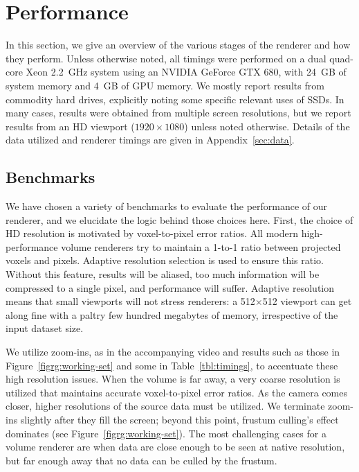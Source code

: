 \section{Performance}
\label{sec:performance}

In this section, we give an overview of the various stages of the
renderer and how they perform.  Unless otherwise noted, all timings
were performed on a dual quad-core Xeon 2.2~GHz system using an NVIDIA
GeForce GTX 680, with 24~GB of system memory and 4~GB of GPU memory.
We mostly report results from commodity hard drives, explicitly noting
some specific relevant uses of SSDs.  In many cases, results were
obtained from multiple screen resolutions, but we report results from
an HD viewport ($1920\times1080$) unless noted otherwise.  Details of
the data utilized and renderer timings are given in
Appendix~\ref{sec:data}.

\subsection{Benchmarks}

We have chosen a variety of benchmarks to evaluate the performance of
our renderer, and we elucidate the logic behind those choices here.
First, the choice of HD resolution is motivated by voxel-to-pixel error
ratios.  All modern high-performance volume renderers try to maintain a
1-to-1 ratio between projected voxels and pixels.  Adaptive resolution
selection is used to ensure this ratio.  Without this feature, results
will be aliased, too much information will be compressed to a single
pixel, and performance will suffer.  Adaptive resolution means that
small viewports will not stress renderers: a 512$\times$512 viewport
can get along fine with a paltry few hundred megabytes of memory,
irrespective of the input dataset size.

We utilize zoom-ins, as in the accompanying video and results such as
those in Figure~\ref{figrg:working-set} and some in
Table~\ref{tbl:timings}, to accentuate these high resolution issues.
When the volume is far away, a very coarse resolution is utilized that
maintains accurate voxel-to-pixel error ratios.  As the camera comes
closer, higher resolutions of the source data must be utilized.  We
terminate zoom-ins slightly after they fill the screen; beyond this
point, frustum culling's effect dominates (see
Figure~\ref{figrg:working-set}).  The most challenging cases for a
volume renderer are when data are close enough to be seen at native
resolution, but far enough away that no data can be culled by the
frustum.

